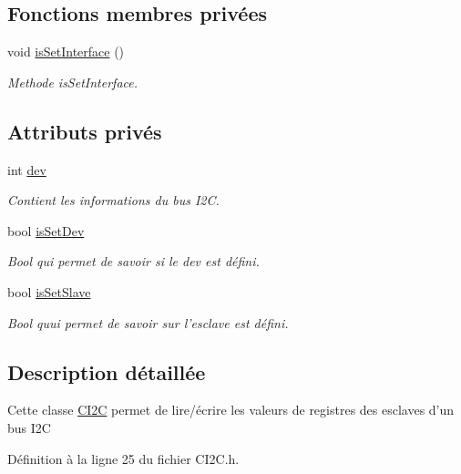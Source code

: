 \subsection*{Fonctions membres privées}
\begin{DoxyCompactItemize}
\item 
void \hyperlink{class_c_i2_c_a821adb4a309a1377fef4d1b8487a731e}{is\+Set\+Interface} ()
\begin{DoxyCompactList}\small\item\em Methode is\+Set\+Interface. \end{DoxyCompactList}\end{DoxyCompactItemize}
\subsection*{Attributs privés}
\begin{DoxyCompactItemize}
\item 
int \hyperlink{class_c_i2_c_ae2d4648eadc2acae86a49cecbf39ce56}{dev}
\begin{DoxyCompactList}\small\item\em Contient les informations du bus I2\+C. \end{DoxyCompactList}\item 
bool \hyperlink{class_c_i2_c_a892d111f995589334497f2b573ab436d}{is\+Set\+Dev}
\begin{DoxyCompactList}\small\item\em Bool qui permet de savoir si le dev est défini. \end{DoxyCompactList}\item 
bool \hyperlink{class_c_i2_c_a19200c12efe17b560256641cce4f5909}{is\+Set\+Slave}
\begin{DoxyCompactList}\small\item\em Bool quui permet de savoir sur l'esclave est défini. \end{DoxyCompactList}\end{DoxyCompactItemize}


\subsection{Description détaillée}
Cette classe \hyperlink{class_c_i2_c}{C\+I2\+C} permet de lire/écrire les valeurs de registres des esclaves d'un bus I2\+C 

Définition à la ligne 25 du fichier C\+I2\+C.\+h.



